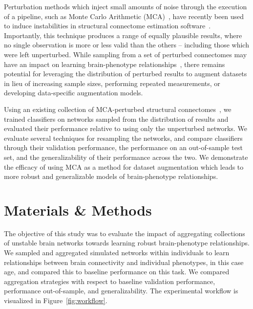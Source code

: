 \documentclass[10pt]{SelfArx} %
\newcommand{\new}[1]{\color{blue}#1\color{black}\xspace}
\begin{document}
Perturbation methods which inject small amounts of noise through the execution of a pipeline, such as Monte Carlo
Arithmetic (MCA)~\cite{Parker1997-qq,Denis2016-wo}, have recently been used to induce instabilities in structural
connectome estimation software~\cite{Kiar2020-lb}. Importantly, this technique produces a range of equally plausible
results, where no single observation is more or less valid than the others – including those which were left
unperturbed. While sampling from a set of perturbed connectomes may have an impact on learning brain-phenotype
relationships~\cite{Kiar2020-kz}, there remains potential for leveraging the distribution of perturbed results to
augment datasets in lieu of increasing sample sizes, performing repeated measurements, \new{or developing data-specific
augmentation models}.

Using an existing collection of MCA-perturbed structural connectomes~\cite{Kiar2020-yz}, we trained classifiers on
networks sampled from the distribution of results and evaluated their performance relative to using only the
unperturbed networks. We evaluate several techniques for resampling the networks, and compare classifiers through their
validation performance, the performance on an out-of-sample test set, and the generalizability of their performance
across the two. We demonstrate the efficacy of using MCA as a method for dataset augmentation which leads to more
robust and generalizable models of brain-phenotype relationships.


\section*{Materials \& Methods}

The objective of this study was to evaluate the impact of aggregating collections of unstable brain networks towards
learning robust brain-phenotype relationships. We sampled and aggregated simulated networks within individuals to learn
relationships between brain connectivity and individual phenotypes, in this case age, and compared this to baseline
performance on this task. We compared aggregation strategies with respect to baseline validation performance,
performance out-of-sample, and generalizability. The experimental workflow is visualized in Figure~\ref{fig:workflow}.
\end{document}
